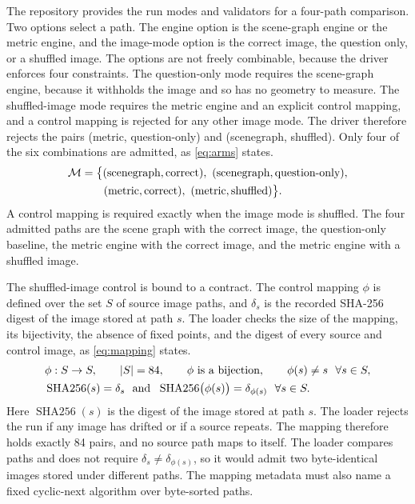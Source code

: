 \documentclass{article}
\begin{document}
The repository provides the run modes and validators for a four-path comparison. Two options select a path. The engine option is the scene-graph engine or the metric engine, and the image-mode option is the correct image, the question only, or a shuffled image. The options are not freely combinable, because the driver enforces four constraints. The question-only mode requires the scene-graph engine, because it withholds the image and so has no geometry to measure. The shuffled-image mode requires the metric engine and an explicit control mapping, and a control mapping is rejected for any other image mode. The driver therefore rejects the pairs (metric, question-only) and (scenegraph, shuffled). Only four of the six combinations are admitted, as \cref{eq:arms} states.
\begin{align}
  \mathcal{M} &= \bigl\{(\text{scenegraph}, \text{correct}),\ (\text{scenegraph}, \text{question-only}), \notag\\
  &\qquad (\text{metric}, \text{correct}),\ (\text{metric}, \text{shuffled})\bigr\}. \label{eq:arms}
\end{align}
A control mapping is required exactly when the image mode is shuffled. The four admitted paths are the scene graph with the correct image, the question-only baseline, the metric engine with the correct image, and the metric engine with a shuffled image.

The shuffled-image control is bound to a contract. The control mapping $\phi$ is defined over the set $S$ of source image paths, and $\delta_s$ is the recorded SHA-256 digest of the image stored at path $s$. The loader checks the size of the mapping, its bijectivity, the absence of fixed points, and the digest of every source and control image, as \cref{eq:mapping} states.
\begin{align}
  &\phi : S \to S, \qquad \lvert S \rvert = 84, \qquad \phi \text{ is a bijection}, \qquad \phi(s) \ne s \ \ \forall s \in S, \notag\\
  &\operatorname{SHA256}(s) = \delta_s \ \text{ and } \ \operatorname{SHA256}\bigl(\phi(s)\bigr) = \delta_{\phi(s)} \ \ \forall s \in S. \label{eq:mapping}
\end{align}
Here $\operatorname{SHA256}(s)$ is the digest of the image stored at path $s$. The loader rejects the run if any image has drifted or if a source repeats. The mapping therefore holds exactly 84 pairs, and no source path maps to itself. The loader compares paths and does not require $\delta_s \ne \delta_{\phi(s)}$, so it would admit two byte-identical images stored under different paths. The mapping metadata must also name a fixed cyclic-next algorithm over byte-sorted paths.
\end{document}
